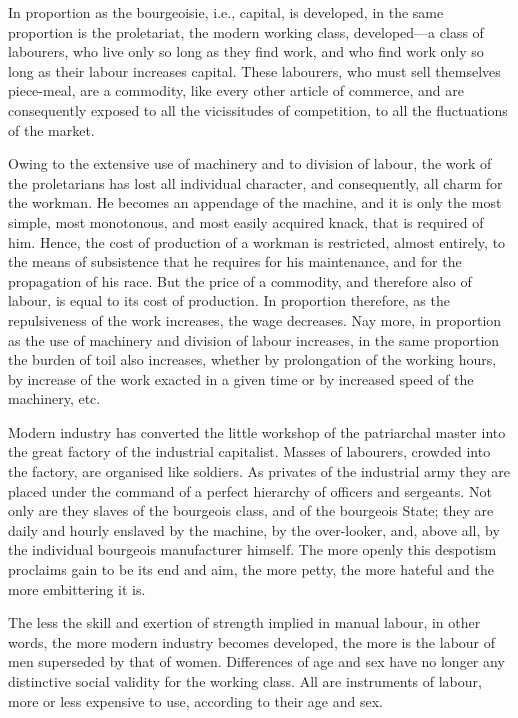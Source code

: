 \documentclass[, oneside]{article}   	%
\begin{document}
In proportion as the bourgeoisie, i.e., capital, is developed, in the same proportion is the proletariat, the modern working class, developed—a class of labourers, who live only so long as they find work, and who find work only so long as their labour increases capital. These labourers, who must sell themselves piece-meal, are a commodity, like every other article of commerce, and are consequently exposed to all the vicissitudes of competition, to all the fluctuations of the market.

Owing to the extensive use of machinery and to division of labour, the work of the proletarians has lost all individual character, and consequently, all charm for the workman. He becomes an appendage of the machine, and it is only the most simple, most monotonous, and most easily acquired knack, that is required of him. Hence, the cost of production of a workman is restricted, almost entirely, to the means of subsistence that he requires for his maintenance, and for the propagation of his race. But the price of a commodity, and therefore also of labour, is equal to its cost of production. In proportion therefore, as the repulsiveness of the work increases, the wage decreases. Nay more, in proportion as the use of machinery and division of labour increases, in the same proportion the burden of toil also increases, whether by prolongation of the working hours, by increase of the work exacted in a given time or by increased speed of the machinery, etc.

Modern industry has converted the little workshop of the patriarchal master into the great factory of the industrial capitalist. Masses of labourers, crowded into the factory, are organised like soldiers. As privates of the industrial army they are placed under the command of a perfect hierarchy of officers and sergeants. Not only are they slaves of the bourgeois class, and of the bourgeois State; they are daily and hourly enslaved by the machine, by the over-looker, and, above all, by the individual bourgeois manufacturer himself. The more openly this despotism proclaims gain to be its end and aim, the more petty, the more hateful and the more embittering it is.

The less the skill and exertion of strength implied in manual labour, in other words, the more modern industry becomes developed, the more is the labour of men superseded by that of women. Differences of age and sex have no longer any distinctive social validity for the working class. All are instruments of labour, more or less expensive to use, according to their age and sex.
\end{document}
